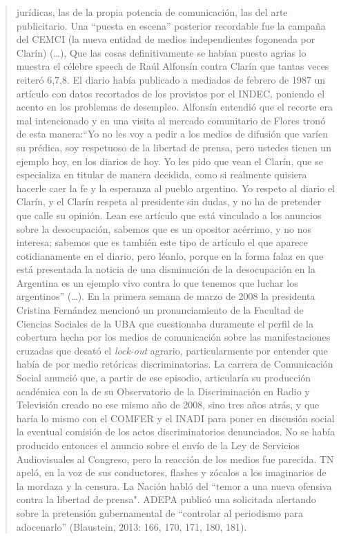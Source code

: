 \begin{quote}
jurídicas, las de la propia potencia de comunicación, las del arte publicitario. Una ``puesta en escena'' posterior recordable fue la campaña del CEMCI (la nueva entidad de medios independientes fogoneada por Clarín) (\ldots), Que las cosas definitivamente se habían puesto agrias lo muestra el célebre speech de Raúl Alfonsín contra Clarín que tantas veces reiteró 6,7,8. El diario había publicado a mediados de febrero de 1987 un artículo con datos recortados de los provistos por el INDEC, poniendo el acento en los problemas de desempleo. Alfonsín entendió que el recorte era mal intencionado y en una visita al mercado comunitario de Flores tronó de esta manera:``Yo no les voy a pedir a los medios de difusión que varíen su prédica, soy respetuoso de la libertad de prensa, pero ustedes tienen un ejemplo hoy, en los diarios de hoy. Yo les pido que vean el Clarín, que se especializa en titular de manera decidida, como si realmente quisiera hacerle caer la fe y la esperanza al pueblo argentino. Yo respeto al diario el Clarín, y el Clarín respeta al presidente sin dudas, y no ha de pretender que calle su opinión. Lean ese artículo que está vinculado a los anuncios sobre la desocupación, sabemos que es un opositor acérrimo, y no nos interesa; sabemos que es también este tipo de artículo el que aparece cotidianamente en el diario, pero léanlo, porque en la forma falaz en que está presentada la noticia de una disminución de la desocupación en la Argentina es un ejemplo vivo contra lo que tenemos que luchar los argentinos'' (\ldots). En la primera semana de marzo de 2008 la presidenta Cristina Fernández mencionó un pronunciamiento de la Facultad de Ciencias Sociales de la UBA que cuestionaba duramente el perfil de la cobertura hecha por los medios de comunicación sobre las manifestaciones cruzadas que desató el \emph{lock-out} agrario, particularmente por entender que había de por medio retóricas discriminatorias. La carrera de Comunicación Social anunció que, a partir de ese episodio, articularía su producción académica con la de su Observatorio de la Discriminación en Radio y Televisión creado no ese mismo año de 2008, sino tres años atrás, y que haría lo mismo con el COMFER y el INADI para poner en discusión social la eventual comisión de los actos discriminatorios denunciados. No se había producido entonces el anuncio sobre el envío de la Ley de Servicios Audiovisuales al Congreso, pero la reacción de los medios fue parecida. TN apeló, en la voz de sus conductores, flashes y zócalos a los imaginarios de la mordaza y la censura. La Nación habló del ``temor a una nueva ofensiva contra la libertad de prensa". ADEPA publicó una solicitada alertando sobre la pretensión gubernamental de ``controlar al periodismo para adocenarlo'' (Blaustein, 2013: 166, 170, 171, 180, 181).
\end{quote}

